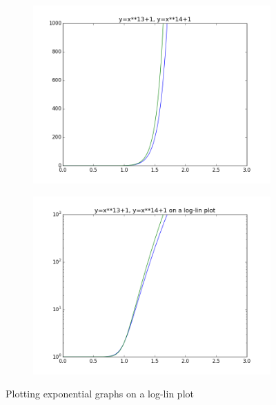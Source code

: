 \begin{figure}[h]
\centering
\begin{subfigure}{.45\textwidth}
\centering
\includegraphics[width=\textwidth]{exponential.png}
\end{subfigure}
\begin{subfigure}{.45\textwidth}
\centering
\includegraphics[width=\textwidth]{exponential_loglin}
\end{subfigure}
\caption{Plotting exponential graphs on a log-lin plot}
\label{fig:exp}
\end{figure}

